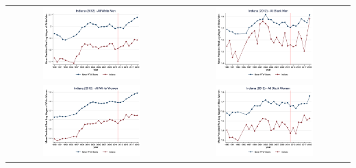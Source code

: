 \documentclass[11pt]{article}
\begin{document}
{\pagebreak
\begin{landscape}
\begin{table}[h!]
    \centering
    \label{fig:pta_in}
    \begin{tabular}{c c}
          \includegraphics[width = 0.6\textwidth, keepaspectratio]{figures/pta/fin_wm_in.png} & \includegraphics[width = 0.6\textwidth, keepaspectratio]{figures/pta/fin_bm_in.png} \\
          \includegraphics[width = 0.6\textwidth, keepaspectratio]{figures/pta/fin_wf_in.png} & \includegraphics[width = 0.6\textwidth, keepaspectratio]{figures/pta/fin_bf_in.png}
    \end{tabular}
\end{table}
\end{landscape}

}
\end{document}

